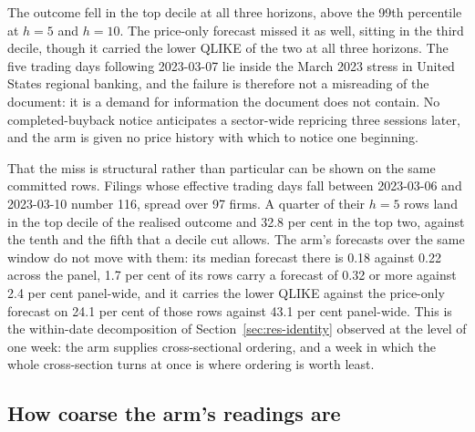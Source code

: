 The outcome fell in the top decile at all three horizons, above the 99th
percentile at $h{=}5$ and $h{=}10$. %
The price-only forecast missed it as well, sitting in the third decile, though
it carried the lower QLIKE of the two at all three horizons. %
The five trading days following 2023-03-07 lie inside the March 2023 stress in
United States regional banking, and the failure is therefore not a misreading
of the document: it is a demand for information the document does not contain.
No completed-buyback notice anticipates a sector-wide repricing three sessions
later, and the arm is given no price history with which to notice one
beginning.

That the miss is structural rather than particular can be shown on the same
committed rows. Filings whose effective trading days fall between 2023-03-06
and 2023-03-10 number 116, spread over 97 firms. A quarter of their $h{=}5$
rows land in the top decile of the realised outcome and 32.8 per cent in the
top two, against the tenth and the fifth that a decile cut allows. %
The arm's forecasts over the same window do not move with them: its median
forecast there is 0.18 against 0.22 across the panel, 1.7 per cent of its rows
carry a forecast of 0.32 or more against 2.4 per cent panel-wide, and it carries the
lower QLIKE against the price-only forecast on 24.1 per cent of those rows
against 43.1 per cent panel-wide. %
This is the within-date decomposition of Section~\ref{sec:res-identity}
observed at the level of one week: the arm supplies cross-sectional ordering,
and a week in which the whole cross-section turns at once is where ordering is
worth least.

\subsection*{How coarse the arm's readings are}

